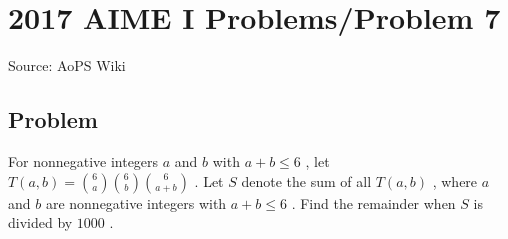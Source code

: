 \documentclass[12pt]{article}
\begin{document}
\section*{{2017 AIME I Problems/Problem 7}}
Source: AoPS Wiki

\subsection*{Problem}
For nonnegative integers $a$ and $b$ with $a + b \leq 6$ , let $T(a, b) = \binom{6}{a} \binom{6}{b} \binom{6}{a + b}$ . Let $S$ denote the sum of all $T(a, b)$ , where $a$ and $b$ are nonnegative integers with $a + b \leq 6$ . Find the remainder when $S$ is divided by $1000$ .
\end{document}
